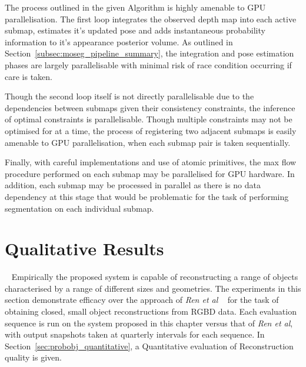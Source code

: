 The process outlined in the given Algorithm is highly amenable to GPU parallelisation. 
The first loop integrates the observed depth map into each active submap, estimates it's updated 
pose and adds instantaneous probability information to it's appearance posterior volume. As 
outlined in Section~\ref{subsec:moseg_pipeline_summary}, the integration and pose estimation phases 
are largely parallelisable with minimal risk of race condition occurring if care is taken.

Though the second loop itself is not directly parallelisable due to the dependencies between submaps 
given their consistency constraints, the inference of optimal constraints is parallelisable. Though 
multiple constraints may not be optimised for at a time, the process of registering two adjacent 
submaps is easily amenable to GPU parallelisation, when each submap pair is taken sequentially.

Finally, with careful implementations and use of atomic primitives, the max flow procedure performed 
on each submap may be parallelised for GPU hardware. In addition, each submap may be processed in 
parallel as there is no data dependency at this stage that would be problematic for the task of 
performing segmentation on each individual submap.

\section{Qualitative Results}
~\label{sec:probobj_qualitative}
Empirically the proposed system is capable of reconstructing a range of objects 
characterised by a range of different sizes and geometries. The experiments in 
this section demonstrate efficacy over the approach of \textit{Ren et al}
~\cite{Ren2013} for the task of obtaining closed, small object reconstructions 
from RGBD data. Each evaluation sequence is run on the system proposed in this 
chapter versus that of \textit{Ren et al}, with output snapshots taken at 
quarterly intervals for each sequence. In Section~\ref{sec:probobj_quantitative}, 
a Quantitative evaluation of Reconstruction quality is given.

